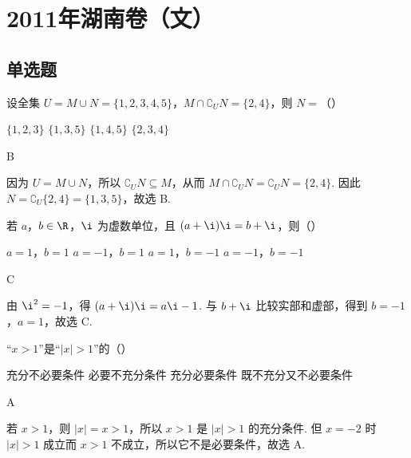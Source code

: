 \chapter{2011年湖南卷（文）}

\section{单选题}

\begin{problem}
设全集 \(U = M \cup N = \{1, 2, 3, 4, 5\}\)，\(M \cap \complement_U N = \{2, 4\}\)，则 \(N =\)（\quad）

\choices
    {\(\{1, 2, 3\}\)}
    {\(\{1,3,5\}\)}
    {\(\{1,4,5\}\)}
    {\(\{2,3,4\}\)}
\end{problem}

\begin{answer}
B
\end{answer}

\begin{solution}
因为 \(U=M\cup N\)，所以 \(\complement_U N\subseteq M\)，从而
\(M\cap\complement_U N=\complement_U N=\{2,4\}\). 因此
\(N=\complement_U\{2,4\}=\{1,3,5\}\)，故选 B.
\end{solution}

\begin{problem}
若 \(a\)，\(b\in\R\)，\(\i\) 为虚数单位，且 \((a + \i)\i = b + \i\)，则（\quad）

\choices
    {\(a = 1\)，\(b = 1\)}
    {\(a = -1\)，\(b = 1\)}
    {\(a = 1\)，\(b = -1\)}
    {\(a = -1\)，\(b = -1\)}
\end{problem}

\begin{answer}
C
\end{answer}

\begin{solution}
由 \(\i^2=-1\)，得
\((a+\i)\i=a\i-1\). 与 \(b+\i\) 比较实部和虚部，得到
\(b=-1\)，\(a=1\)，故选 C.
\end{solution}

\begin{problem}
“\(x>1\)”是“\(|x|>1\)”的（\quad）

\choices
    {充分不必要条件}
    {必要不充分条件}
    {充分必要条件}
    {既不充分又不必要条件}
\end{problem}

\begin{answer}
A
\end{answer}

\begin{solution}
若 \(x>1\)，则 \(|x|=x>1\)，所以 \(x>1\) 是 \(|x|>1\) 的充分条件.
但 \(x=-2\) 时 \(|x|>1\) 成立而 \(x>1\) 不成立，所以它不是必要条件，故选 A.
\end{solution}

